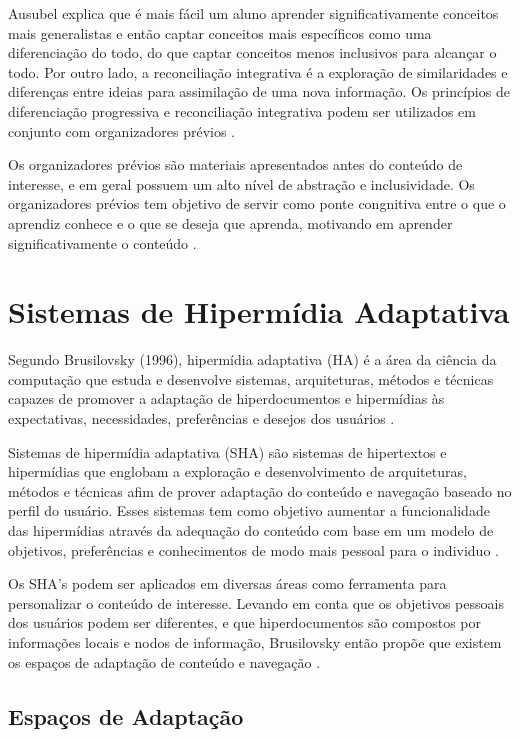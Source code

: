 Ausubel explica que é mais fácil um aluno aprender significativamente conceitos mais generalistas e então captar conceitos mais específicos como uma diferenciação do todo, do que captar conceitos menos inclusivos para alcançar o todo. Por outro lado, a reconciliação integrativa é a exploração  de similaridades e diferenças entre ideias para assimilação de uma nova informação. Os princípios de diferenciação progressiva e reconciliação integrativa podem ser utilizados em conjunto com organizadores prévios \cite{fragelli2010}.

Os organizadores prévios são materiais apresentados antes do conteúdo de interesse, e em geral possuem um alto nível de abstração e inclusividade. Os organizadores prévios tem objetivo de servir como ponte congnitiva entre o que o aprendiz conhece e o que se deseja que aprenda, motivando em aprender significativamente o conteúdo \cite{ausubel2000, tavares2010}.

\section{Sistemas de Hipermídia Adaptativa}

Segundo Brusilovsky (1996), hipermídia adaptativa (HA) é a área da ciência da computação que estuda e desenvolve sistemas, arquiteturas, métodos e técnicas capazes de promover a adaptação de hiperdocumentos e hipermídias às expectativas, necessidades, preferências e desejos dos usuários \cite{diniz2011, diniz2012}.

Sistemas de hipermídia adaptativa (SHA) são sistemas de hipertextos e hipermídias que englobam a exploração e desenvolvimento de arquiteturas, métodos e técnicas afim de prover adaptação do conteúdo e navegação baseado no perfil do usuário. Esses sistemas tem como objetivo aumentar a funcionalidade das hipermídias através da adequação do conteúdo com base em um modelo de objetivos, preferências e conhecimentos de modo mais pessoal para o individuo \cite{brusilovsky1996, fragelli2010}.

Os SHA's podem ser aplicados em diversas áreas como ferramenta para personalizar o conteúdo de interesse. Levando em conta que os objetivos pessoais dos usuários podem ser diferentes, e que hiperdocumentos são compostos por informações locais e nodos de informação, Brusilovsky então propõe que  existem os espaços de adaptação de conteúdo e navegação \cite{brusilovsky1996}.

\subsection{Espaços de Adaptação}

